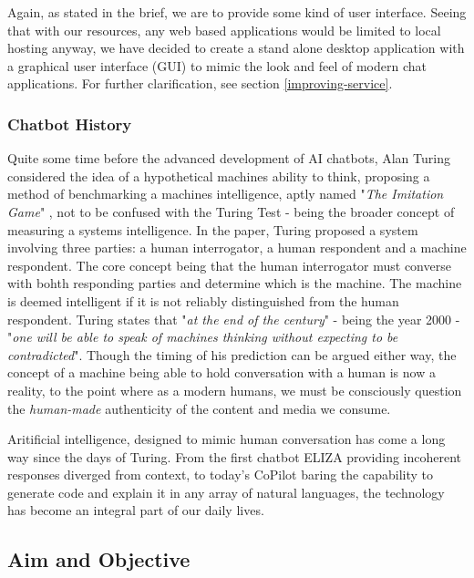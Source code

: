 \documentclass[11pt]{article}
\begin{document}
Again, as stated in the brief, we are to provide some kind of user interface. Seeing that with our resources, any web based applications would be limited to local hosting anyway, we have decided to create a stand alone desktop application with a graphical user interface (GUI) to mimic the look and feel of modern chat applications. For further clarification, see section \ref{improving-service}.

\subsubsection{Chatbot History} \label{chatbot-history}

Quite some time before the advanced development of AI chatbots, Alan Turing considered the idea of a hypothetical machines ability to think, proposing a method of benchmarking a machines intelligence, aptly named "\textit{The Imitation Game}" \cite{turing1950}, not to be confused with the Turing Test - being the broader concept of measuring a systems intelligence. In the paper, Turing proposed a system involving three parties: a human interrogator, a human respondent and a machine respondent. The core concept being that the human interrogator must converse with bohth responding parties and determine which is the machine. The machine is deemed intelligent if it is not reliably distinguished from the human respondent. Turing states that "\textit{at the end of the century}" - being the year 2000 - "\textit{one will be able to speak of machines thinking without expecting to be contradicted}". Though the timing of his prediction can be argued either way, the concept of a machine being able to hold conversation with a human is now a reality, to the point where as a modern humans, we must be consciously question the \textit{human-made} authenticity of the content and media we consume.

Aritificial intelligence, designed to mimic human conversation has come a long way since the days of Turing. From the first chatbot ELIZA \cite{eliza} providing incoherent responses diverged from context, to today's CoPilot \cite{copilot} baring the capability to generate code and explain it in any array of natural languages, the technology has become an integral part of our daily lives.


\subsection{Aim and Objective} \label{aim-objective}
\end{document}
